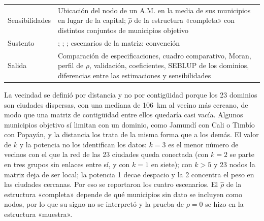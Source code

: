 \begin{table}[!htbp]
\begin{tabularx}{\linewidth}{>{\raggedright\arraybackslash}p{2.8cm} >{\raggedright\arraybackslash}X}
Sensibilidades & Ubicación del nodo de un A.M. en la media de sus municipios en lugar de la capital; $\hat{\rho}$ de la estructura «completa» con distintos conjuntos de municipios objetivo \\
Sustento & \cite[pp.~490--494]{morales2021smallarea}; \cite[pp.~146--149]{Benedetti2024}; \cite{PetrucciSalvati2006, PratesiSalvati2008}; escenarios de la matriz: convención \\
Salida & Comparación de especificaciones, cuadro comparativo, Moran, perfil de $\rho$, validación, coeficientes, SEBLUP de los dominios, diferencias entre las estimaciones y sensibilidades \\
\bottomrule
\end{tabularx}
\end{table}

La vecindad se definió por distancia y no por contigüidad porque los 23 dominios son ciudades dispersas, con una mediana de 106~km al vecino más cercano, de modo que una matriz de contigüidad entre ellos quedaría casi vacía. Algunos municipios objetivo sí limitan con un dominio, como Jamundí con Cali o Timbío con Popayán, y la distancia los trata de la misma forma que a los demás. El valor de $k$ y la potencia no los identifican los datos: $k = 3$ es el menor número de vecinos con el que la red de las 23 ciudades queda conectada (con $k = 2$ se parte en tres grupos sin enlaces entre sí, y con $k = 1$ en siete); con $k > 5$ y 23 nodos la matriz deja de ser local; la potencia 1 decae despacio y la 2 concentra el peso en las ciudades cercanas. Por eso se reportaron los cuatro escenarios. El $\hat{\rho}$ de la estructura «completa» depende de qué municipios sin dato se incluyen como nodos, por lo que su signo no se interpretó y la prueba de $\rho = 0$ se hizo en la estructura «muestra».

